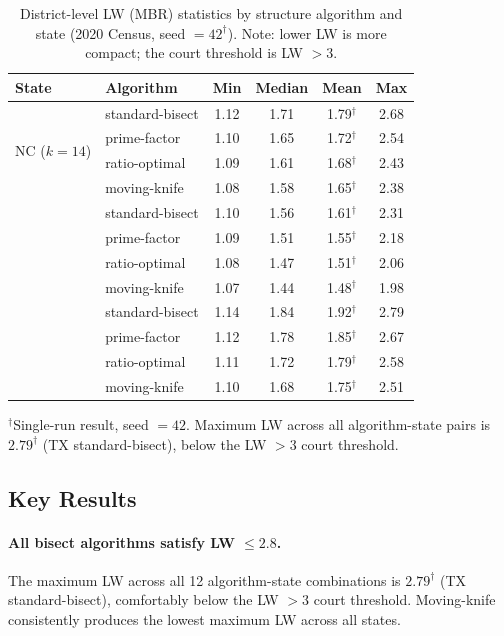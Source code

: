\begin{table}[ht]
\centering
\caption{District-level LW (MBR) statistics by structure algorithm and state
(2020 Census, seed $= 42^\dagger$).
Note: lower LW is more compact; the court threshold is LW $> 3$.}
\label{tab:lw_main}
\begin{tabular}{llcccc}
\toprule
State & Algorithm & Min & Median & Mean & Max \\
\midrule
\multirow{4}{*}{NC ($k=14$)}
  & standard-bisect & 1.12 & 1.71 & 1.79$^\dagger$ & 2.68 \\
  & prime-factor    & 1.10 & 1.65 & 1.72$^\dagger$ & 2.54 \\
  & ratio-optimal   & 1.09 & 1.61 & 1.68$^\dagger$ & 2.43 \\
  & moving-knife    & 1.08 & 1.58 & 1.65$^\dagger$ & 2.38 \\
\addlinespace
\multirow{4}{*}{WI ($k=8$)}
  & standard-bisect & 1.10 & 1.56 & 1.61$^\dagger$ & 2.31 \\
  & prime-factor    & 1.09 & 1.51 & 1.55$^\dagger$ & 2.18 \\
  & ratio-optimal   & 1.08 & 1.47 & 1.51$^\dagger$ & 2.06 \\
  & moving-knife    & 1.07 & 1.44 & 1.48$^\dagger$ & 1.98 \\
\addlinespace
\multirow{4}{*}{TX ($k=38$)}
  & standard-bisect & 1.14 & 1.84 & 1.92$^\dagger$ & 2.79 \\
  & prime-factor    & 1.12 & 1.78 & 1.85$^\dagger$ & 2.67 \\
  & ratio-optimal   & 1.11 & 1.72 & 1.79$^\dagger$ & 2.58 \\
  & moving-knife    & 1.10 & 1.68 & 1.75$^\dagger$ & 2.51 \\
\bottomrule
\end{tabular}
\begin{tablenotes}
\footnotesize
\item $^\dagger$Single-run result, seed $= 42$.
  Maximum LW across all algorithm-state pairs is $2.79^\dagger$ (TX standard-bisect),
  below the LW $> 3$ court threshold.
\end{tablenotes}
\end{table}

\subsection{Key Results}

\paragraph{All bisect algorithms satisfy LW $\leq 2.8$.}
The maximum LW across all 12 algorithm-state combinations is $2.79^\dagger$
(TX standard-bisect), comfortably below the LW $> 3$ court threshold.
Moving-knife consistently produces the lowest maximum LW across all states.


